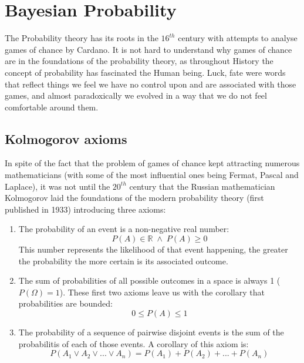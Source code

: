 \section{Bayesian Probability}
\label{sec:int_bayesian_probability}

\label{subsec:int_int_bayesian_probability}

The Probability theory has its roots in the $16^{th}$ century with attempts to analyse games of chance by Cardano. It is not hard to understand why games of chance are in the foundations of the probability theory, as throughout History the concept of probability has fascinated the Human being. Luck, fate were words that reflect things we feel we have no control upon and are associated with those games, and almost paradoxically we evolved in a way that we do not feel comfortable around them. 

\subsection{Kolmogorov axioms}

In spite of the fact that the problem of games of chance kept attracting numerous mathematicians (with some of the most influential ones being Fermat, Pascal and Laplace), it was not until the $20^{th}$ century that the Russian mathematician Kolmogorov laid the foundations of the modern probability theory (first published in 1933) introducing three axioms\cite{sep-probability-interpret}:

\begin{enumerate}
\item The probability of an event is a non-negative real number:
\begin{equation}
 P(A)\in\mathbb{R\;}\wedge\; P(A)\geq0
\end{equation}
This number represents the likelihood of that event happening, the greater the probability the more certain is its associated outcome. 
\item The sum of probabilities of all possible outcomes in a space is always 1 ($P(\Omega)=1$). These first two axioms leave us with the corollary that probabilities are bounded:
 \begin{equation}
0\leq P(A)\leq1
\end{equation}
\item The probability of a sequence of pairwise disjoint events is the sum of the probabilitis of each of those events. A corollary of this axiom is:
\begin{equation}
P(A_{1}\vee A_{2} \vee ... \vee A_{n})=P(A_{1})+P(A_{2}) + ... + P(A_{n})
\end{equation}

\end{enumerate}

